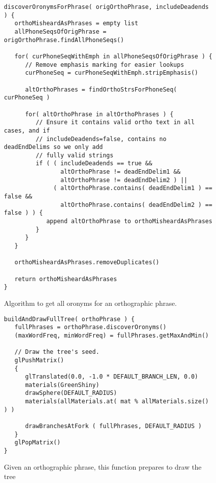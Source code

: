\setlength\LTleft{-2in}
\begin{figure}
\begin{verbatim}
discoverOronymsForPhrase( origOrthoPhrase, includeDeadends ) {
   orthoMisheardAsPhrases = empty list
   allPhoneSeqsOfOrigPhrase = origOrthoPhrase.findAllPhoneSeqs()
   
   for( curPhoneSeqWithEmph in allPhoneSeqsOfOrigPhrase ) {
      // Remove emphasis marking for easier lookups
      curPhoneSeq = curPhoneSeqWithEmph.stripEmphasis()

      altOrthoPhrases = findOrthoStrsForPhoneSeq( curPhoneSeq )
      
      for( altOrthoPhrase in altOrthoPhrases ) {
         // Ensure it contains valid ortho text in all cases, and if
         // includeDeadends=false, contains no deadEndDelims so we only add
         // fully valid strings
         if ( ( includeDeadends == true &&
                altOrthoPhrase != deadEndDelim1 &&
                altOrthoPhrase != deadEndDelim2 ) ||
              ( altOrthoPhrase.contains( deadEndDelim1 ) == false &&
                altOrthoPhrase.contains( deadEndDelim2 ) == false ) ) {
            append altOrthoPhrase to orthoMisheardAsPhrases
         }
      }
   }
   
   orthoMisheardAsPhrases.removeDuplicates()

   return orthoMisheardAsPhrases
}
\end{verbatim}
\captionfonts
\caption[Pseudocode for discoverOronymsForPhrase]{ Algorithm to get all oronyms for an orthographic phrase. }
\label{fig:psuedoCode:discoverOronymsForPhrase}
\end{figure}
\setlength\LTleft{2in}

\begin{figure}
\begin{verbatim}
buildAndDrawFullTree( orthoPhrase ) {
   fullPhrases = orthoPhrase.discoverOronyms()
   (maxWordFreq, minWordFreq) = fullPhrases.getMaxAndMin()
   
   // Draw the tree's seed.
   glPushMatrix()
   {
      glTranslated(0.0, -1.0 * DEFAULT_BRANCH_LEN, 0.0)
      materials(GreenShiny)
      drawSphere(DEFAULT_RADIUS)
      materials(allMaterials.at( mat % allMaterials.size() ) )
      
      drawBranchesAtFork ( fullPhrases, DEFAULT_RADIUS )
   }
   glPopMatrix()
}
\end{verbatim}
\captionfonts
\caption[Code for buildAndDrawFullTree]{ Given an orthographic phrase, this function prepares to draw the tree }
\label{fig:psuedoCode:buildAndDrawFullTree}
\end{figure}


